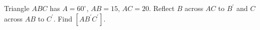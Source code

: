 Triangle $ABC$ has $A=60^\circ$, $AB=15$, $AC=20$. Reflect $B$ across $AC$ to $B^{\prime}$ and $C$ across $AB$ to $C^{\prime}$. Find $[AB^{\prime} C^{\prime}]$.
